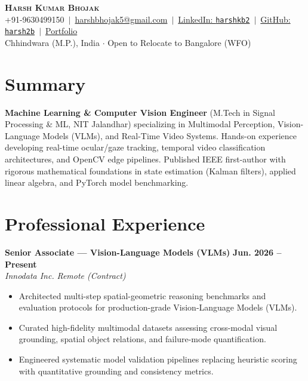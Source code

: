 \documentclass[10pt,a4paper]{article}
\begin{document}
\begin{center}
    {\LARGE \textbf{\textsc{Harsh Kumar Bhojak}}} \\[2.5pt]
    \small
    +91-9630499150 \,$\vert$\, 
    \href{mailto:harshbhojak5@gmail.com}{harshbhojak5@gmail.com} \,$\vert$\, 
    \href{https://linkedin.com/in/harshkb2}{LinkedIn: \texttt{harshkb2}} \,$\vert$\, 
    \href{https://github.com/harsh2b}{GitHub: \texttt{harsh2b}} \,$\vert$\, 
    \href{https://harsh2b.github.io/}{Portfolio} \\[1.5pt]
    \footnotesize Chhindwara (M.P.), India $\cdot$ Open to Relocate to Bangalore (WFO)
\end{center}

\vspace{-6pt}

\section*{Summary}
\noindent\small
\textbf{Machine Learning \& Computer Vision Engineer} (M.Tech in Signal Processing \& ML, NIT Jalandhar) specializing in Multimodal Perception, Vision-Language Models (VLMs), and Real-Time Video Systems. Hands-on experience developing real-time ocular/gaze tracking, temporal video classification architectures, and OpenCV edge pipelines. Published IEEE first-author with rigorous mathematical foundations in state estimation (Kalman filters), applied linear algebra, and PyTorch model benchmarking.

\section*{Professional Experience}

\noindent\textbf{Senior Associate --- Vision-Language Models (VLMs)} \hfill \textbf{Jun. 2026 -- Present} \\
\textit{Innodata Inc.} \hfill \textit{Remote (Contract)}
\begin{itemize}
    \item Architected multi-step spatial-geometric reasoning benchmarks and evaluation protocols for production-grade Vision-Language Models (VLMs).
    \item Curated high-fidelity multimodal datasets assessing cross-modal visual grounding, spatial object relations, and failure-mode quantification.
    \item Engineered systematic model validation pipelines replacing heuristic scoring with quantitative grounding and consistency metrics.
\end{itemize}
\end{document}
